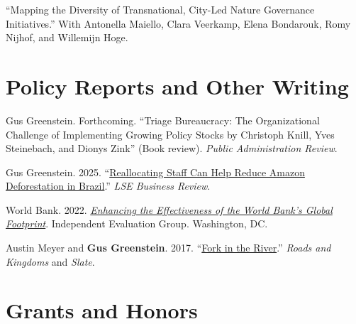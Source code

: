\documentclass[11pt, letterpaper]{article}
\begin{document}
\vspace{0.5em}

``Mapping the Diversity of Transnational, City-Led Nature Governance Initiatives.'' With Antonella Maiello, Clara Veerkamp, Elena Bondarouk, Romy Nijhof, and Willemijn Hoge.

\section{Policy Reports and Other Writing}

Gus Greenstein. Forthcoming. ``Triage Bureaucracy: The Organizational Challenge of Implementing Growing Policy Stocks by Christoph Knill, Yves Steinebach, and Dionys Zink'' (Book review). \textit{Public Administration Review}.

\vspace{0.5em}

Gus Greenstein. 2025. ``\href{https://blogs.lse.ac.uk/businessreview/2025/02/13/reallocating-staff-can-help-reduce-amazon-deforestation-in-brazil/}{Reallocating Staff Can Help Reduce Amazon Deforestation in Brazil}.'' \textit{LSE Business Review}.

\vspace{0.5em}

World Bank. 2022. \textit{\href{https://ieg.worldbankgroup.org/evaluations/enhancing-effectiveness-world-banks-global-footprint}{Enhancing the Effectiveness of the World Bank's Global Footprint}}. Independent Evaluation Group. Washington, DC.

\vspace{0.5em}

Austin Meyer and \textbf{Gus Greenstein}. 2017. ``\href{https://roadsandkingdoms.com/2017/fork-in-the-river/}{Fork in the River}.'' \textit{Roads and Kingdoms} and \textit{Slate}.

\section{Grants and Honors}
\end{document}
